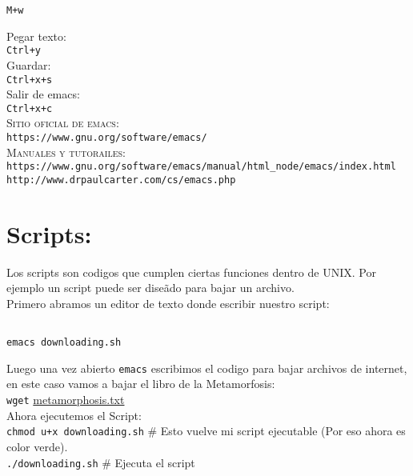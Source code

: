 \documentclass[12pt]{article}
\begin{document}
\texttt{M+w}

Pegar texto:\\

\texttt{Ctrl+y}\\


Guardar:\\

\texttt{Ctrl+x+s}\\

Salir de emacs:\\

\texttt{Ctrl+x+c}\\

\textsc{Sitio oficial de emacs:}\\
\verb"https://www.gnu.org/software/emacs/"\\

\textsc{Manuales y tutorailes:}\\
\verb"https://www.gnu.org/software/emacs/manual/html_node/emacs/index.html"\\
\verb"http://www.drpaulcarter.com/cs/emacs.php"\\


\section*{Scripts:}

Los scripts son codigos que cumplen ciertas funciones dentro de UNIX. Por ejemplo
un script puede ser dise\~ado para bajar un archivo. \\


Primero abramos un editor de texto donde escribir nuestro script:\\ 

\begin{verbatim}

emacs downloading.sh

\end{verbatim}

Luego una vez abierto \verb"emacs" escribimos el codigo para bajar archivos de internet, en este
caso vamos a bajar el libro de la Metamorfosis:\\

\verb"wget"  \href{https://raw.githubusercontent.com/jngaravitoc/HerramientasComputacionales/master/Lectures/2.Unix-TextEditors/Hands-on/metamorphosis.txt}{metamorphosis.txt} \\

Ahora ejecutemos el Script:\\

\verb"chmod u+x downloading.sh" \#  Esto vuelve mi script ejecutable (Por eso ahora es color verde).\\

\verb"./downloading.sh"   \# Ejecuta el script
\end{document}
